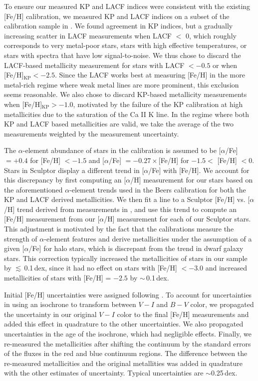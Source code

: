 \documentclass{emulateapj-rtx4}
\begin{document}
To ensure our measured KP and LACF indices were consistent with the existing [Fe/H] calibration, 
we measured KP and LACF indices on a subset of the calibration sample in 
\cite{brn+99}. We found agreement in KP indices, 
but a gradually increasing scatter in LACF measurements when
LACF $<$ 0, which roughly corresponds to very 
metal-poor stars, stars with high effective temperatures, or stars with 
spectra that have low signal-to-noise. We thus chose to discard the LACF-based metallicity 
measurement for stars with LACF $< -0.5$ or when [Fe/H]$_{\text{KP}} < -2.5$. 
Since the LACF works best at measuring [Fe/H] in the more metal-rich
regime where weak metal lines are more prominent, this exclusion seems reasonable.
We also chose to discard KP-based metallicity measurements when [Fe/H]$_{\text{KP}} > -1.0$,
motivated by the failure of the KP calibration at high metallicities due to the saturation of the 
Ca II K line. In the regime where both KP and LACF based metallicities are valid, we take the average of
the two measurements weighted by the measurement uncertainty.

The $\alpha$-element abundance of stars in the \citet{brn+99} calibration
is assumed to be [$\alpha$/Fe] $ = +0.4$ for [Fe/H] $< -1.5$ and 
[$\alpha$/Fe] $= -0.27 \times $[Fe/H] for $-1.5 <$ [Fe/H] $< 0$.
Stars in Sculptor display a different trend in [$\alpha$/Fe] with [Fe/H].
We account for this discrepancy by first computing an [$\alpha$/H] measurement
for our stars based on the aforementioned $\alpha$-element trends used in the 
Beers calibration for both the
KP and LACF derived metallicities.
We then fit a line to a Sculptor [Fe/H] vs. [$\alpha$/H] trend derived from measurements in \citet{kgb+09},
and use this trend to compute an [Fe/H] measurement from our [$\alpha$/H] measurement
for each of our Sculptor stars. This adjustment is motivated by the fact that
the \citet{brn+99} calibrations measure the strength of $\alpha$-element features and 
derive metallicities under the assumption of a given [$\alpha$/Fe] for halo stars, which is discrepant from
the trend in dwarf galaxy stars. 
This correction typically increased the metallicities of stars in our sample by $\lesssim$\,0.1\,dex, since it had no effect on stars with [Fe/H] $< -3.0$ and increased metallicities of stars with [Fe/H] = $-2.5$ by $\sim$\,0.1\,dex.

Initial [Fe/H] uncertainties were assigned following \citet{brn+99}. 
To account for uncertainties in using an isochrone to transform 
between $V-I$ and $B-V$ color,
we propagated the uncertainty in our original $V-I$ color to the final
[Fe/H] measurements and added this effect in quadrature to the other uncertainties.
We also propagated uncertainties in the age of the isochrone, 
which had negligible effects. 
Finally, we re-measured the metallicities after shifting the continuum by the standard errors of the fluxes in the red and blue continuum regions.
The difference between the re-measured metallicities and the original metallities was added in quadrature with the other estimates of uncertainty.
Typical uncertainties are $\sim$0.25\,dex.
\end{document}
